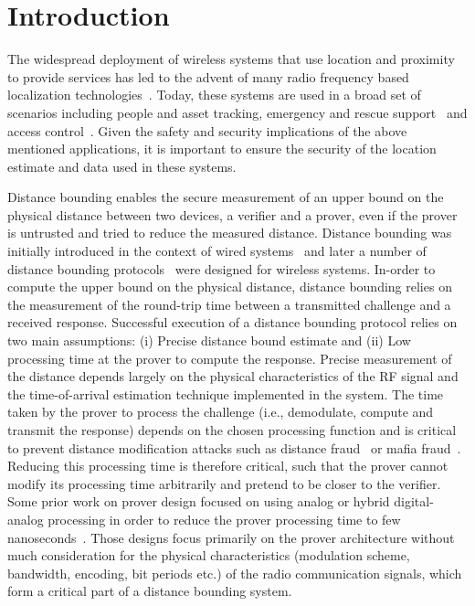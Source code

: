 \documentclass{sig-alternate-10pt}
\newcommand{\ie}{i.e.,\xspace}
\begin{document}
\section{Introduction}
\label{sec:introduction}
The widespread deployment of wireless systems that use location and
proximity to provide services has led to the advent of many radio frequency
based localization technologies~\cite{LiuNov07}. Today, these systems are used
in a broad set of scenarios including people and asset tracking, emergency and
rescue support~\cite{fischer10} and access
control~\cite{GuptaMar06,RasmussenNov09}. Given the safety and security
implications of the above mentioned applications, it is important to ensure the
security of the location estimate and data used in these systems.

Distance bounding enables the secure measurement of an upper bound on the
physical distance between two devices, a verifier and a prover, even if the
prover is untrusted and tried to reduce the measured distance. Distance bounding
was initially introduced in the context of wired systems~\cite{BrandsMay93} and
later a number of distance bounding
protocols~\cite{TippenhauerSep09,TuSep07,HanckeSep05,RasmussenAug10,MunillaNov08,ReidMar07,BussardMay05,CapkunOct03,Lopez09,Lopez10,SingeleeJul07}
were designed for wireless systems. In-order to compute the upper bound on the
physical distance, distance bounding relies on the measurement of the round-trip
time between a transmitted challenge and a received response. Successful
execution of a distance bounding protocol relies on two main assumptions: (i)
Precise distance bound estimate and (ii) Low processing time at the prover to
compute the response. Precise measurement of the distance depends largely on the
physical characteristics of the RF signal and the time-of-arrival estimation
technique implemented in the system. The time taken by the prover to process the
challenge (\ie demodulate, compute and transmit the response) depends on the
chosen processing function and is critical to prevent distance modification
attacks such as distance fraud~\cite{BrandsMay93} or mafia
fraud~\cite{DesmedtAug87}. Reducing this processing time is therefore critical,
such that the prover cannot modify its processing time arbitrarily and pretend
to be closer to the verifier. Some prior work on prover design focused on using
analog or hybrid digital-analog processing in order to reduce the prover
processing time to few nanoseconds~\cite{RasmussenAug10,RanganathanSep12}. Those
designs focus primarily on the prover architecture without much consideration
for the physical characteristics (modulation scheme, bandwidth, encoding, bit
periods etc.) of the radio communication signals, which form a critical part of
a distance bounding system.
\end{document}
